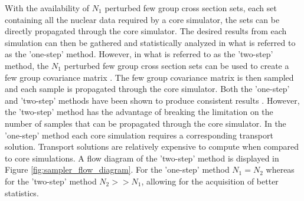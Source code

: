 With the availability of $N_1$ perturbed few group cross section sets, each set containing all the nuclear data required by a core simulator, the sets can be directly propagated through the core simulator. The desired results from each simulation can then be gathered and statistically analyzed in what is referred to as the 'one-step' method. However, in what is referred to as the 'two-step' method, the $N_1$ perturbed few group cross section sets can be used to create a few group covariance matrix \cite{TwoStep_Approach}. The few group covariance matrix is then sampled and each sample is propagated through the core simulator. Both the 'one-step' and 'two-step' methods have been shown to produce consistent results \cite{TwoStep_Approach}. However, the 'two-step' method has the advantage of breaking the limitation on the number of samples that can be propagated through the core simulator. In the 'one-step' method each core simulation requires a corresponding transport solution. Transport solutions are relatively expensive to compute when compared to core simulations. A flow diagram of the 'two-step' method is displayed in Figure \ref{fig:sampler_flow_diagram}. For the 'one-step' method $N_1=N_2$ whereas for the 'two-step' method $N_2 >> N_1$, allowing for the acquisition of better statistics.        
